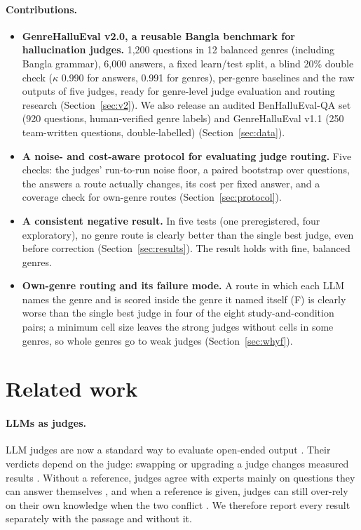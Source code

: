 \documentclass[pdflatex,sn-apa]{sn-jnl}
\begin{document}
\paragraph{Contributions.}
\begin{itemize}
  \item \textbf{GenreHalluEval v2.0, a reusable Bangla benchmark for hallucination judges.} 1,200 questions in 12
  balanced genres (including Bangla grammar), 6,000 answers, a fixed learn/test split, a blind 20\% double check
  ($\kappa$ 0.990 for answers, 0.991 for genres), per-genre baselines and the raw outputs of five judges, ready for
  genre-level judge evaluation and routing research (Section~\ref{sec:v2}). We also release an audited
  BenHalluEval-QA set (920 questions, human-verified genre labels) and GenreHalluEval v1.1 (250 team-written
  questions, double-labelled) (Section~\ref{sec:data}).
  \item \textbf{A noise- and cost-aware protocol for evaluating judge routing.} Five checks: the judges' run-to-run
  noise floor, a paired bootstrap over questions, the answers a route actually changes, its cost per fixed answer,
  and a coverage check for own-genre routes (Section~\ref{sec:protocol}).
  \item \textbf{A consistent negative result.} In five tests (one preregistered, four exploratory), no genre route
  is clearly better than the single best judge, even before correction (Section~\ref{sec:results}). The result holds
  with fine, balanced genres.
  \item \textbf{Own-genre routing and its failure mode.} A route in which each LLM names the genre and is scored
  inside the genre it named itself (F) is clearly worse than the single best judge in four of the eight
  study-and-condition pairs; a minimum cell size leaves the strong judges without cells in some genres, so whole genres
  go to weak judges (Section~\ref{sec:whyf}).
\end{itemize}

\section{Related work}

\paragraph{LLMs as judges.} LLM judges are now a standard way to evaluate open-ended output \citep{zheng2023judging}.
Their verdicts depend on the judge: swapping or upgrading a judge changes measured results
\citep{judgechanges2026}. Without a reference, judges agree with experts mainly on questions they can answer
themselves \citep{nofreelabels2025}, and when a reference is given, judges can still over-rely on their own knowledge
when the two conflict \citep{judgingreference2026}. We therefore report every result separately with the passage and
without it.
\end{document}
